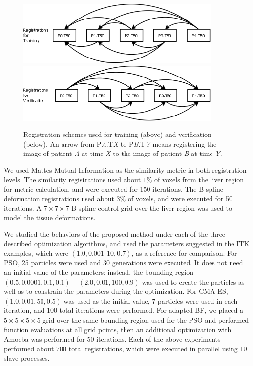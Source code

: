 \documentclass[]{spie}  %
\begin{document}
\begin{figure}
\begin{center}
\includegraphics[width=4in]{registrations_for_training}
\includegraphics[width=4in]{registrations_for_verification}
\end{center}
\caption{Registration schemes used for training (above) and verification (below). An arrow from P\textit{A}.T\textit{X} to P\textit{B}.T\textit{Y} means registering the image of patient \textit{A} at time \textit{X} to the image of patient \textit{B} at time \textit{Y}.}
\label{fig:testing_schemes}
\end{figure}

We used Mattes Mutual Information \cite{Mattes01:SPIE} as the similarity metric in both registration levels. The similarity registrations used about $1\%$ of voxels from the liver region for metric calculation, and were executed for 150 iterations. The B-spline deformation registrations used about $3\%$ of voxels, and were executed for 50 iterations. A $7 \times 7 \times 7$ B-spline control grid over the liver region was used to model the tissue deformations.

We studied the behaviors of the proposed method under each of the three described optimization algorithms, and used the parameters suggested in the ITK examples, which were $(1.0,0.001,10,0.7)$, as a reference for comparison. 
For PSO, 25 particles were used and 30 generations were executed. It does not need an initial value of the parameters; instead, the bounding region $(0.5,0.0001,0.1,0.1)-(2.0,0.01,100,0.9)$ was used to create the particles as well as to constrain the parameters during the optimization. 
For CMA-ES, $(1.0,0.01,50,0.5)$ was used as the initial value, 7 particles were used in each iteration, and 100 total iterations were performed. 
For adapted BF, we placed a $5 \times 5 \times 5 \times 5$ grid over the same bounding region used for the PSO and performed function evaluations at all grid points, then an additional optimization with Amoeba was performed for 50 iterations. Each of the above experiments performed about 700 total registrations, which were executed in  parallel using 10 slave processes.
\end{document}
